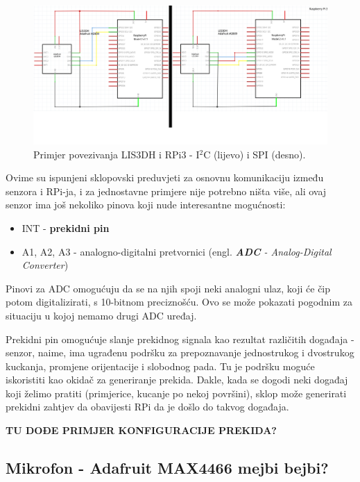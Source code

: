 \documentclass[12pt,a4paper]{article}
\begin{document}
		\begin{figure}[h!]
			\includegraphics[width=\linewidth]{slike/i2cSpiMergeNoLabel.png}
			\caption{Primjer povezivanja LIS3DH i RPi3 - I$^2$C (lijevo) i SPI (desno).}
			\label{fig:lis3dhRpi}
		\end{figure}

		\par Ovime su ispunjeni sklopovski preduvjeti za osnovnu komunikaciju između senzora i RPi-ja, i za jednostavne primjere nije potrebno ništa više, ali ovaj senzor ima još nekoliko pinova koji nude interesantne mogućnosti:
		\begin{itemize}
			\item INT - \textbf{prekidni pin}
			\item A1, A2, A3 - analogno-digitalni pretvornici (engl. \textit{\textbf{ADC} - Analog-Digital Converter}) \\
		\end{itemize}

		Pinovi za ADC omogućuju da se na njih spoji neki analogni ulaz, koji će čip potom digitalizirati, s 10-bitnom preciznošću. Ovo se može pokazati pogodnim za situaciju u kojoj nemamo drugi ADC uređaj. 

		\par Prekidni pin omogućuje slanje prekidnog signala kao rezultat različitih događaja - senzor, naime, ima ugrađenu podršku za prepoznavanje jednostrukog i dvostrukog kuckanja, promjene orijentacije i slobodnog pada. Tu je podršku moguće iskoristiti kao okidač za generiranje prekida. Dakle, kada se dogodi neki događaj koji želimo pratiti (primjerice, kucanje po nekoj površini), sklop može generirati prekidni zahtjev da obavijesti RPi da je došlo do takvog događaja.

		\par \textbf{TU DOĐE PRIMJER KONFIGURACIJE PREKIDA?}


	\newpage
	\subsection{Mikrofon - Adafruit MAX4466 mejbi bejbi?}
\newpage
\end{document}
